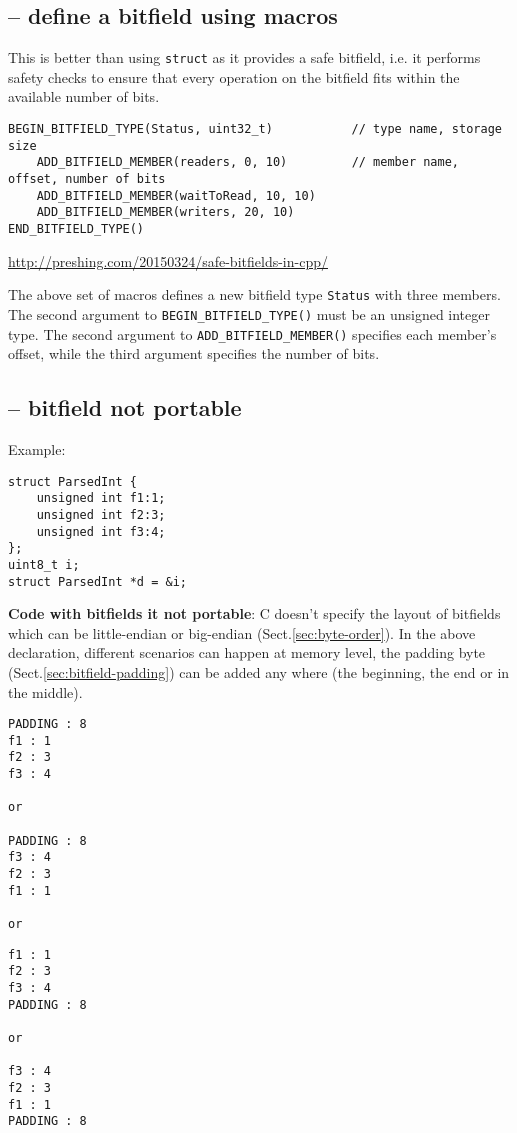 \subsection{-- define a bitfield using macros}

This is better than using \verb!struct! as it provides a safe bitfield, i.e.
it performs safety checks to ensure that every operation on the bitfield fits
within the available number of bits.

\begin{lstlisting}
BEGIN_BITFIELD_TYPE(Status, uint32_t)           // type name, storage size
    ADD_BITFIELD_MEMBER(readers, 0, 10)         // member name, offset, number of bits
    ADD_BITFIELD_MEMBER(waitToRead, 10, 10)
    ADD_BITFIELD_MEMBER(writers, 20, 10)
END_BITFIELD_TYPE()
\end{lstlisting}
\url{http://preshing.com/20150324/safe-bitfields-in-cpp/}

The above set of macros defines a new bitfield type \verb!Status! with three
members. The second argument to \verb!BEGIN_BITFIELD_TYPE()! must be an unsigned
integer type. The second argument to \verb!ADD_BITFIELD_MEMBER()! specifies each
member's offset, while the third argument specifies the number of bits.

\subsection{-- bitfield not portable}
\label{sec:bitfield-not-portable}

Example:
\begin{verbatim}
struct ParsedInt {
    unsigned int f1:1;
    unsigned int f2:3;
    unsigned int f3:4;
};
uint8_t i;
struct ParsedInt *d = &i;
\end{verbatim}

{\bf Code with bitfields it not portable}: C doesn't specify the layout of
bitfields which can be little-endian or big-endian (Sect.\ref{sec:byte-order}).
In the above declaration, different scenarios can happen at memory level, the
padding byte (Sect.\ref{sec:bitfield-padding}) can be added any where (the
beginning, the end or in the middle).

\begin{minipage}[t]{0.5\textwidth}
\begin{verbatim}
PADDING : 8
f1 : 1
f2 : 3
f3 : 4

or

PADDING : 8
f3 : 4
f2 : 3
f1 : 1

or
\end{verbatim}
\end{minipage}
\begin{minipage}[t]{0.5\textwidth}
\begin{verbatim}
f1 : 1
f2 : 3
f3 : 4
PADDING : 8

or

f3 : 4
f2 : 3
f1 : 1
PADDING : 8
\end{verbatim}
\end{minipage}

